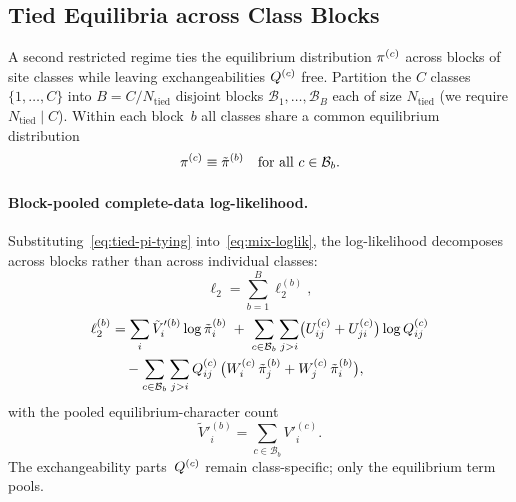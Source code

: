 \subsection{Tied Equilibria across Class Blocks}
\label{sec:mstep-tied-pi}

A second restricted regime ties the equilibrium distribution
$\pi^{(c)}$ across blocks of site classes while leaving
exchangeabilities $Q^{(c)}$ free.  Partition the $C$ classes
$\{1,\dots,C\}$ into $B = C / N_{\mathrm{tied}}$ disjoint blocks
$\mathcal{B}_1,\dots,\mathcal{B}_B$ each of size $N_{\mathrm{tied}}$
(we require $N_{\mathrm{tied}} \mid C$).  Within each block~$b$ all
classes share a common equilibrium distribution
\begin{equation}\label{eq:tied-pi-tying}
\pi^{(c)} \equiv \tilde{\pi}^{(b)}
\quad \text{for all } c \in \mathcal{B}_b.
\end{equation}

\paragraph{Block-pooled complete-data log-likelihood.}
Substituting~\eqref{eq:tied-pi-tying} into~\eqref{eq:mix-loglik}, the
log-likelihood decomposes across blocks rather than across individual
classes:
\begin{equation}\label{eq:tied-pi-loglik}
\ell_2 = \sum_{b=1}^{B} \ell_2^{(b)},
\end{equation}
\begin{align}
\ell_2^{(b)} &=
   \sum_i \tilde V'^{(b)}_i \log \tilde{\pi}^{(b)}_i
   \;+\; \sum_{c\in\mathcal{B}_b}\sum_{j>i}
        \bigl(U^{(c)}_{ij}+U^{(c)}_{ji}\bigr)\log Q^{(c)}_{ij}
   \notag\\
&\quad - \sum_{c\in\mathcal{B}_b}\sum_{j>i}
   Q^{(c)}_{ij}\,
   \bigl(W^{(c)}_i\,\tilde{\pi}^{(b)}_j
        + W^{(c)}_j\,\tilde{\pi}^{(b)}_i\bigr),
\label{eq:tied-pi-loglik-b}
\end{align}
with the pooled equilibrium-character count
\begin{equation}\label{eq:tied-pi-Vprime}
\tilde V'^{(b)}_i = \sum_{c\in\mathcal{B}_b} V'^{(c)}_i.
\end{equation}
The exchangeability parts~$Q^{(c)}$ remain class-specific; only
the equilibrium term pools.

